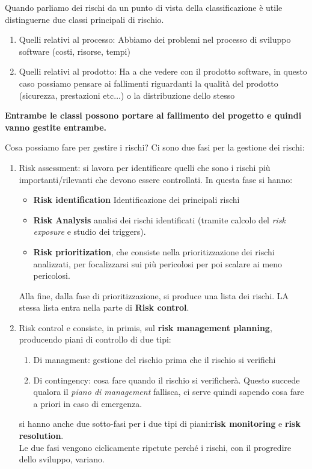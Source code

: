 Quando parliamo dei rischi da un punto di vista della classificazione è utile distinguerne due classi principali di rischio.
\begin{enumerate}
    \item Quelli relativi al processo: Abbiamo dei problemi nel processo di sviluppo software (costi, risorse, tempi)
    \item Quelli relativi al prodotto: Ha a che vedere con il prodotto software, in questo caso possiamo pensare ai fallimenti riguardanti la qualità del prodotto (sicurezza, prestazioni etc$\ldots$) o la distribuzione dello stesso
\end{enumerate} 
    \textbf{Entrambe le classi possono portare al fallimento del progetto e quindi
  vanno gestite entrambe.}
  
Cosa possiamo fare per gestire i rischi? Ci sono due fasi per la gestione dei rischi:
\begin{enumerate}
    \item Risk assessment:  si lavora per identificare quelli che sono i rischi più importanti/rilevanti che devono essere controllati. In questa fase si hanno:
    \begin{itemize}
        \item \textbf{Risk identification} Identificazione dei principali rischi
        \item \textbf{Risk Analysis} analisi dei rischi identificati (tramite calcolo del \textit{risk exposure} e studio dei triggers).
        \item \textbf{Risk prioritization}, che consiste nella prioritizzazione dei rischi analizzati, per focalizzarsi sui più pericolosi per poi scalare ai meno pericolosi.
    \end{itemize} Alla fine, dalla fase di prioritizzazione, si produce una lista dei rischi. LA stessa lista entra nella parte di \textbf{Risk control}.
    \item Risk control e consiste, in primis, sul \textbf{risk management planning}, producendo piani di controllo di due tipi:
    \begin{enumerate}
        \item Di managment: gestione del rischio prima che il rischio si verifichi 
        \item Di contingency: cosa fare quando il rischio si verificherà. Questo succede qualora il \textit{piano di management} fallisca, ci serve quindi sapendo cosa fare a priori in caso di emergenza.
    \end{enumerate} si hanno anche due sotto-fasi per i due tipi di piani:\textbf{risk monitoring} e \textbf{risk resolution}.\\
    Le due fasi vengono ciclicamente ripetute perché i rischi, con il progredire dello sviluppo, variano.  
\end{enumerate}

